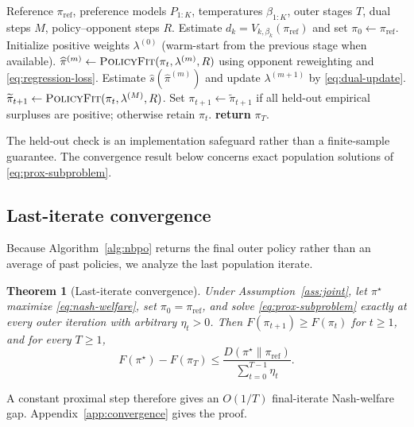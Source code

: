 \documentclass{article}
\newtheorem{theorem}{Theorem}
\theoremstyle{remark}
\theoremstyle{plain}
\newcommand{\piref}{\pi_{\mathrm{ref}}}
\begin{document}
\begin{algorithm}[t]
\caption{Nash Bargaining Preference Optimization}
\label{alg:nbpo}
\begin{algorithmic}[1]
\REQUIRE Reference $\piref$, preference models $P_{1:K}$, temperatures $\beta_{1:K}$, outer stages $T$, dual steps $M$, policy--opponent steps $R$.
\STATE Estimate $d_k=V_{k,\beta_k}(\piref)$ and set $\pi_0\leftarrow\piref$.
    \STATE Initialize positive weights $\lambda^{(0)}$ (warm-start from the previous stage when available).
        \STATE $\widehat\pi^{(m)}\leftarrow\textsc{PolicyFit}(\pi_t,\lambda^{(m)},R)$ using opponent reweighting and \eqref{eq:regression-loss}.
        \STATE Estimate $\widehat s(\widehat\pi^{(m)})$ and update $\lambda^{(m+1)}$ by \eqref{eq:dual-update}.
    \ENDFOR
    \STATE $\widetilde\pi_{t+1}\leftarrow\textsc{PolicyFit}(\pi_t,\lambda^{(M)},R)$.
    \STATE Set $\pi_{t+1}\leftarrow\widetilde\pi_{t+1}$ if all held-out empirical surpluses are positive; otherwise retain $\pi_t$.
\ENDFOR
\STATE \textbf{return} $\pi_T$.
\end{algorithmic}
\end{algorithm}
The held-out check is an implementation safeguard rather than a finite-sample guarantee. The convergence result below concerns exact population solutions of \eqref{eq:prox-subproblem}.

\subsection{Last-iterate convergence}
Because Algorithm~\ref{alg:nbpo} returns the final outer policy rather than an average of past policies, we analyze the last population iterate.
\begin{theorem}[Last-iterate convergence]
\label{thm:last-iterate}
Under Assumption~\ref{ass:joint}, let $\pi^\star$ maximize \eqref{eq:nash-welfare}, set $\pi_0=\piref$, and solve \eqref{eq:prox-subproblem} exactly at every outer iteration with arbitrary $\eta_t>0$. Then $F(\pi_{t+1})\ge F(\pi_t)$ for $t\ge1$, and for every $T\ge1$,
\begin{equation}
F(\pi^\star)-F(\pi_T)
\le
\frac{D(\pi^\star\|\piref)}{\sum_{t=0}^{T-1}\eta_t}.
\label{eq:last-iterate-rate}
\end{equation}
\end{theorem}
A constant proximal step therefore gives an $O(1/T)$ final-iterate Nash-welfare gap. Appendix~\ref{app:convergence} gives the proof.
\end{document}
